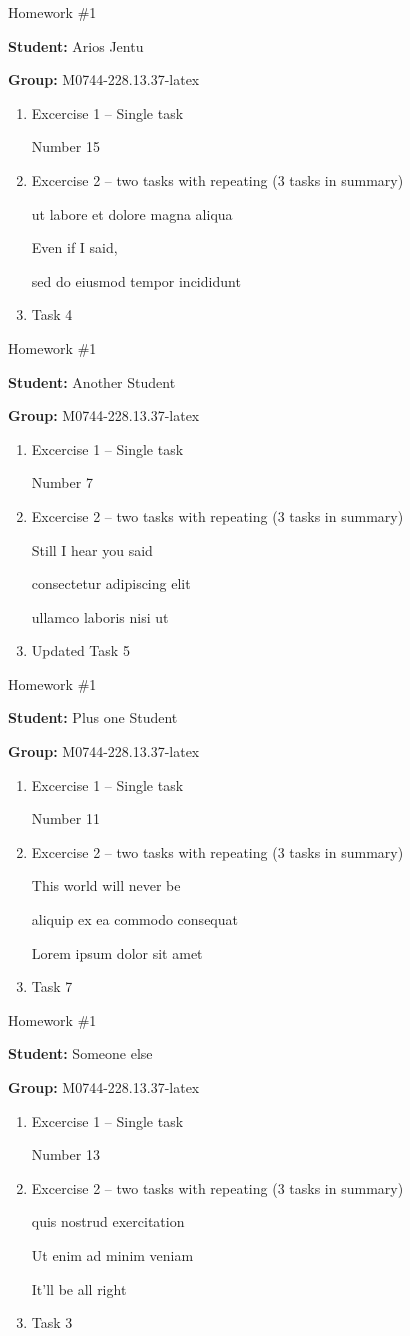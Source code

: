 \documentclass[12pt, fleqn, a4paper]{article}
\newcommand{\preamble}{\lipsum[1]}
\newcommand{\generatepage}[4]{
	\begin{center}
		{\Large #1}

		\textbf{Student:} #2

		\textbf{Group:} #3

	\end{center}

	\vspace{10pt}

	\preamble

	\begin{enumerate}
		#4
	\end{enumerate}

	\pagebreak
}
\begin{document}
	
	\generatepage{Homework \#1}{Arios Jentu}{M0744-228.13.37-latex}{
		\item Excercise 1 -- Single task

			Number 15
		\item Excercise 2 -- two tasks with repeating (3 tasks in summary)

			ut labore et dolore magna aliqua 

			Even if I said,

			sed do eiusmod tempor incididunt 
		\item 

			Task 4
	}

	\generatepage{Homework \#1}{Another Student}{M0744-228.13.37-latex}{
		\item Excercise 1 -- Single task

			Number 7
		\item Excercise 2 -- two tasks with repeating (3 tasks in summary)

			Still I hear you said

			consectetur adipiscing elit

			ullamco laboris nisi ut 
		\item 

			Updated Task 5
	}

	\generatepage{Homework \#1}{Plus one Student}{M0744-228.13.37-latex}{
		\item Excercise 1 -- Single task

			Number 11
		\item Excercise 2 -- two tasks with repeating (3 tasks in summary)

			This world will never be

			aliquip ex ea commodo consequat

			Lorem ipsum dolor sit amet
		\item 

			Task 7
	}

	\generatepage{Homework \#1}{Someone else}{M0744-228.13.37-latex}{
		\item Excercise 1 -- Single task

			Number 13
		\item Excercise 2 -- two tasks with repeating (3 tasks in summary)

			quis nostrud exercitation 

			Ut enim ad minim veniam

			It'll be all right
		\item 

			Task 3
	}
\end{document}
